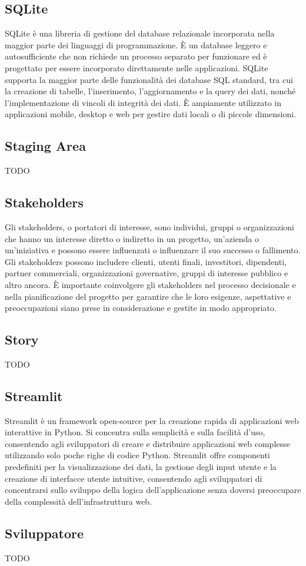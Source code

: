 \subsection*{SQLite}
SQLite è una libreria di gestione del database relazionale incorporata nella maggior parte dei linguaggi di programmazione. È un database leggero e autosufficiente che non richiede un processo separato per funzionare ed è progettato per essere incorporato direttamente nelle applicazioni. SQLite supporta la maggior parte delle funzionalità dei database SQL standard, tra cui la creazione di tabelle, l'inserimento, l'aggiornamento e la query dei dati, nonché l'implementazione di vincoli di integrità dei dati. È ampiamente utilizzato in applicazioni mobile, desktop e web per gestire dati locali o di piccole dimensioni.

\vspace{2em}
\subsection*{Staging Area}
TODO

\vspace{2em}
\subsection*{Stakeholders}
Gli stakeholders, o portatori di interesse, sono individui, gruppi o organizzazioni che hanno un interesse diretto o indiretto in un progetto, un'azienda o un'iniziativa e possono essere influenzati o influenzare il suo successo o fallimento. Gli stakeholders possono includere clienti, utenti finali, investitori, dipendenti, partner commerciali, organizzazioni governative, gruppi di interesse pubblico e altro ancora. È importante coinvolgere gli stakeholders nel processo decisionale e nella pianificazione del progetto per garantire che le loro esigenze, aspettative e preoccupazioni siano prese in considerazione e gestite in modo appropriato.

\vspace{2em}
\subsection*{Story}
TODO

\vspace{2em}
\subsection*{Streamlit}
Streamlit è un framework open-source per la creazione rapida di applicazioni web interattive in Python. Si concentra sulla semplicità e sulla facilità d'uso, consentendo agli sviluppatori di creare e distribuire applicazioni web complesse utilizzando solo poche righe di codice Python. Streamlit offre componenti predefiniti per la visualizzazione dei dati, la gestione degli input utente e la creazione di interfacce utente intuitive, consentendo agli sviluppatori di concentrarsi sullo sviluppo della logica dell'applicazione senza doversi preoccupare della complessità dell'infrastruttura web.

\vspace{2em}
\subsection*{Sviluppatore}
TODO
